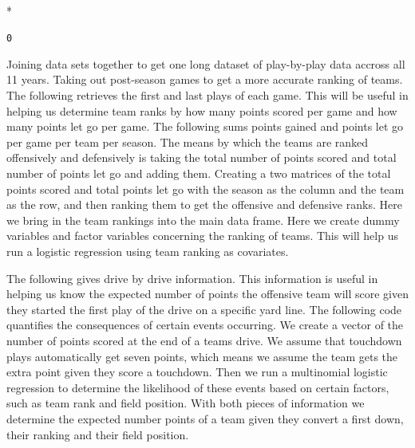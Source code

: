 \documentclass[letterpaper,10pt,english]{/anaconda/lib/python2.7/site-packages/sphinx/texinputs/sphinxhowto}
\def\smaller{\fontsize{9.5pt}{9.5pt}\selectfont}
\newenvironment{InvisibleVerbatim}
        {\begin{mdframed}[leftmargin=0.1\linewidth,innerleftmargin=3pt,innerrightmargin=3pt, userdefinedwidth=1\linewidth, linewidth=0pt, linecolor=white, usetwoside=false]}
        {\end{mdframed}}
\begin{document}
        

            
                \makebox[0.1\linewidth]{\smaller\hfill\tt\color{nbframe-out-prompt}Out\hspace{4pt}{[}2{]}:\hspace{4pt}}\\*
                \vspace{-2.55\baselineskip}\begin{InvisibleVerbatim}
                \vspace{-0.5\baselineskip}
\begin{alltt}0\end{alltt}

            \end{InvisibleVerbatim}
            
        
    
Joining data sets together to get one long dataset of play-by-play data
accross all 11 years.
Taking out post-season games to get a more accurate ranking of teams.
The following retrieves the first and last plays of each game. This will
be useful in helping us determine team ranks by how many points scored
per game and how many points let go per game.
The following sums points gained and points let go per game per team per
season. The means by which the teams are ranked offensively and
defensively is taking the total number of points scored and total number
of points let go and adding them.
Creating a two matrices of the total points scored and total points let
go with the season as the column and the team as the row, and then
ranking them to get the offensive and defensive ranks.
Here we bring in the team rankings into the main data frame.
Here we create dummy variables and factor variables concerning the
ranking of teams. This will help us run a logistic regression using team
ranking as covariates.


The following gives drive by drive information. This information is
useful in helping us know the expected number of points the offensive
team will score given they started the first play of the drive on a
specific yard line.
The following code quantifies the consequences of certain events
occurring. We create a vector of the number of points scored at the end
of a teams drive. We assume that touchdown plays automatically get seven
points, which means we assume the team gets the extra point given they
score a touchdown. Then we run a multinomial logistic regression to
determine the likelihood of these events based on certain factors, such
as team rank and field position. With both pieces of information we
determine the expected number points of a team given they convert a
first down, their ranking and their field position.
\end{document}
